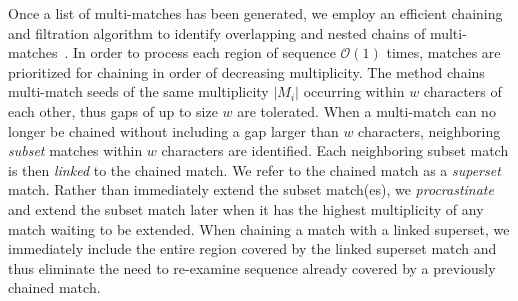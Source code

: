 \documentclass[10pt,journal,letterpaper,compsoc,peerreview]{IEEEtran}
\begin{document}
Once a list of multi-matches has been generated, we employ an
efficient chaining and filtration algorithm to identify overlapping
and nested chains of multi-matches~\cite{ref-procrast}. In order to
process each region of sequence $\mathcal{O}(1)$ times, matches
are prioritized for chaining in order of decreasing multiplicity.  The
method chains multi-match seeds of the same multiplicity $|M_i|$
occurring within $w$ characters of each other, thus gaps of up to size
$w$ are tolerated.  When a multi-match can
no longer be chained without including a gap larger than $w$
characters, neighboring \textit{subset} matches within $w$ characters
are identified. Each neighboring subset match is then \textit{linked}
to the chained match. We refer to the chained match as a
\textit{superset} match. Rather than immediately extend the subset
match(es), we \textit{procrastinate} and extend the subset match later
when it has the highest multiplicity of any match waiting to be
extended. When chaining a match with a linked superset, we immediately
include the entire region covered by the linked superset match and
thus eliminate the need to re-examine sequence already covered by a
previously chained match.
\end{document}
